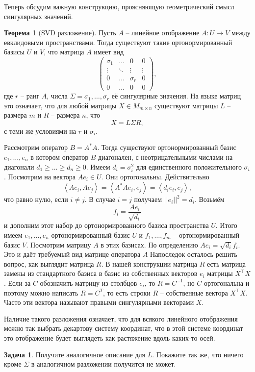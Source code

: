 \documentclass[10pt,a4paper,oneside]{book}
\theoremstyle{definition}
\newtheorem{zad}{{\color{violet!100!black} Задача}}
\newtheorem{thm}{{\color{red!40!black} Теорема}}
\def\lan{\left\langle }
\def\ran{\right\rangle}
\def\thrm{\begin{thm}}
\def\ethrm{\end{thm}}
\def\zd{\begin{zad}}
\def\ezd{\end{zad}}
\def\pmat{\begin{pmatrix}}
\def\epmat{\end{pmatrix}}
\begin{document}
Теперь обсудим важную конструкцию, проясняющую геометрический смысл сингулярных значений.


\thrm[SVD разложение] Пусть $A$ -- линейное отображение $A\colon U \to V$ между евклидовыми пространствами. Тогда существуют такие ортонормированный базисы $U$ и $V$, что матрица $A$ имеет вид 
$$\pmat \sigma_1 &\dots& 0 & 0\\
 \vdots & \ddots &\vdots & \vdots\\
 0 & \dots & \sigma_r & 0\\
 0 &  \dots & 0 & 0 \epmat,$$
 где $r$ -- ранг $A$, числа $\Sigma=\sigma_1, \dots, \sigma_r$ её сингулярные значения.
На языке матриц это означает, что для любой матрицы $X \in M_{m\times n}$ существуют матрицы $L$ -- размера $m$ и $R$ -- размера $n$,  что
$$X= L \Sigma R,$$
 с теми же условиями на $r$ и $\sigma_i$.
 
\proof Рассмотрим оператор $B = A^{*}A$. Тогда существуют ортонормированный базис $e_1,\dots,e_n$ в котором оператор $B$ диагонален, с неотрицательными числами на диагонали $d_1\geq\dots\geq d_n\geq 0$. Имеем  $d_i=\sigma_i^2$ для единственного положительного $\sigma_i$. 
Посмотрим на вектора $Ae_i \in U$. Они ортогональны. Действительно
$$\lan Ae_i, Ae_j\ran = \lan A^{*}Ae_i,e_j \ran = \lan d_i e_i,e_j\ran,$$
что равно нулю, если $i\neq j$. В случае $i=j$ получаем $||e_i||^2=d_i$. Возьмём 
$$f_i=\frac{Ae_i}{\sqrt{d_i}}$$
и дополним этот набор до ортонормированного базиса пространства $U$. Итого имеем $e_1,\dots,e_n$ ортонормированный базис $U$ и $f_1,\dots,f_m$ -- ортонормированный базис $V$.
Посмотрим матрицу $A$ в этих базисах. По определению $Ae_i=\sqrt{d_i}f_i$. Это и даёт требуемый вид матрице оператора $A$
Напоследок осталось решить вопрос, как выглядит матрица $R$. В нашей конструкции матрица $R$ есть матрица замены из стандартного базиса в базис из собственных векторов $e_i$ матрицы $X^{\top}X$. Если за $C$ обозначить матрицу из столбцов $e_i$, то $R=C^{-1}$, но $C$ ортогональна и поэтому можно написать $R=C^{T}$, то есть строки $R$ -- собственные вектора $X^{\top}X$. Часто эти вектора называют правыми сингулярными векторами $X$.

\endproof
\ethrm

Наличие такого разложения означает, что для всякого линейного отображения можно так выбрать декартову систему координат, что в этой системе координат это отображение будет выглядеть как растяжение вдоль каких-то осей.

\zd Получите аналогичное описание для $L$. Покажите так же, что ничего кроме $\Sigma$ в аналогичном разложении получится не может.
\ezd
\end{document}
